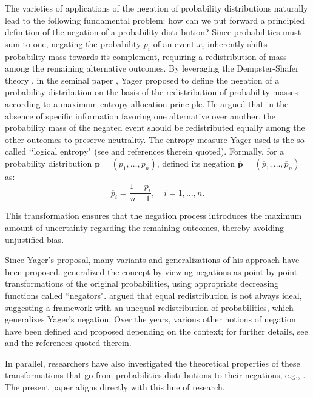 \documentclass[pdflatex,sn-basic,iicol]{sn-jnl}%
\theoremstyle{thmstyleone}%
\theoremstyle{thmstyletwo}%
\theoremstyle{thmstylethree}%
\newcommand{\bp}{\mathbf{p}}
\begin{document}
The varieties of applications of the negation of probability distributions 
naturally lead to the following fundamental problem: how can we put forward a principled definition of the 
 negation of a probability distribution?  {Since probabilities must sum to one, negating
 the probability $p_i$ of an event $x_i$ inherently shifts
 probability mass towards its complement, 
 requiring a redistribution 
 of mass among the remaining alternative outcomes.}
 By leveraging the Dempster-Shafer theory \citep{Shafer1976, smets1994,smets1994_2}, in the seminal paper \citep{Yager2015}, Yager proposed to
define the negation of a probability distribution
on the basis of the redistribution of probability masses according to a maximum entropy allocation principle. He argued that in the absence of specific information favoring one alternative over another, the probability mass of the negated event should be redistributed equally among the other outcomes to preserve neutrality.
The entropy measure Yager used is the so-called \lq\lq logical entropy" (see
\citep{ell} and references therein quoted). Formally, for a probability distribution $\bp=(p_1,\dots,p_n)$,  \cite{Yager2015} defined its 
negation $\overline{\bp} = (\overline{p}_1,\dots,\overline{p}_n)$ as:
\begin{equation*}
    \overline{p}_i = \frac{1-p_i}{n-1}, \quad i=1, \ldots , n.
\end{equation*}

This transformation ensures that the negation process introduces the maximum amount of uncertainty regarding the remaining outcomes, thereby avoiding unjustified bias.

Since Yager's proposal, 
many variants and generalizations of his approach 
have been proposed. \cite{generating} generalized the concept by viewing negations as point-by-point transformations of the original probabilities,  using appropriate decreasing functions called ``negators".
\cite{TANWAR2023113557} argued that equal redistribution is not always ideal, suggesting
a  framework with an unequal redistribution of probabilities, which generalizes Yager's negation. Over the years, various other notions of negation have been defined and proposed depending on the context; for further details, see \citep{ Kaur_comment,Kaur_markov, kaur, LiuDL, Luo_matrix2020, pham_estimating2021, Wu_exp,Xu+,YinDD} and the references quoted therein. 

In parallel, researchers have also investigated the theoretical properties of these transformations that go 
from probabilities distributions to their negations, e.g., \citep{klein2022some,TANWAR2023113557,Yager2015}. 
The present paper aligns directly with this line of research.
\end{document}
